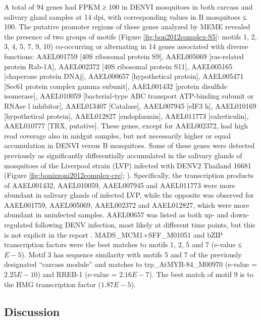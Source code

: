 

A total of 94 genes had FPKM ≥ 100 in \gls{DENVI} mosquitoes in both carcass and salivary gland samples at 14 \gls{dpi}, with corresponding values in B mosquitoes ≤ 100.
The putative promoter regions of these genes analyzed by MEME revealed the presence of two groups of motifs (Figure \ref{fig:bon2012complex-S5}: motifs 1, 2, 3, 4, 5, 7, 9, 10) co-occurring or alternating in 14 genes associated with diverse functions: AAEL001759 [40S ribosomal protein S9], AAEL005069 [ras-related protein Rab-1A], AAEL002372 [40S ribosomal protein S11], AAEL005165 [chaperone protein DNAj], AAEL000657 [hypothetical protein], AAEL005471 [Sec61 protein complex gamma subunit], AAEL001432 [protein disulfide isomerase], AAEL010059 [bacterial-type ABC transport ATP-binding subunit or RNAse l inhibitor], AAEL013407 [Catalase], AAEL007945 [eIF3 h], AAEL010169 [hypothetical protein], AAEL012827 [endoplasmin], AAEL011773 [calreticulin], AAEL010777 [TRX, putative].
These genes, except for AAEL002372, had high read coverage also in midgut samples, but not necessarily higher or equal accumulation in \gls{DENVI} versus B mosquitoes.
Some of these genes were detected previously as significantly differentially accumulated in the salivary glands of mosquitoes of the Liverpool strain (LVP) infected with \gls{DENV}2 Thailand 16681 (Figure \ref{fig:bonizzoni2012complex-cre}; \cite{Luplertlop2011}).
Specifically, the transcription products of AAEL001432, AAEL010059, AAEL007945 and AAEL011773 were more abundant in salivary glands of infected LVP, while the opposite was observed for AAEL001759, AAEL005069, AAEL002372 and AAEL012827, which were more abundant in uninfected samples.
AAEL00657 was listed as both up- and down-regulated following \gls{DENV} infection, most likely at different time points, but this is not explicit in the report \cite{Luplertlop2011}.
MADS\_MCM1+SFF\_M01051 and bZIP transcription factors were the best matches to motifs 1, 2, 5 and 7 (e-value ≤ $E-5$).
Motif 3 has sequence similarity with motifs 5 and 7 of the previously designated “carcass module” and matches to trp\_AtMYB-84\_M00970 (e-value = $2.25E-10$) and RREB-1 (e-value = $2.16E-7$).
The best match of motif 9 is to the HMG transcription factor ($1.87E-5$).


\subsection{Discussion}

